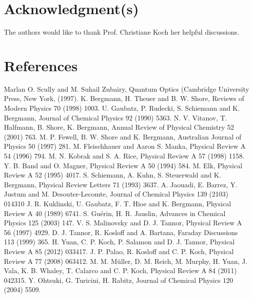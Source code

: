 \documentclass[]{interact}
\theoremstyle{plain}%
\theoremstyle{definition}
\theoremstyle{remark}
\begin{document}
\section*{Acknowledgment(s)}
The authors would like to thank Prof. Christiane Koch her helpful 
discussions.
\section*{References}
\begin{thebibliography}{99}
Marlan O. Scully and M. Suhail Zubairy, Quantum Optics (Cambridge University 
Press, New York, (1997).
K. Bergmann, H. Theuer and B. W. Shore, Reviews of Modern
Physics 70 (1998) 1003.
U. Gaubatz, P. Rudecki, S. Schiemann and K. Bergmann, Journal of Chemical 
Physics 92 (1990) 5363. 
N. V. Vitanov, T. Halfmann, B. Shore, K. Bergmann, Annual Review of Physical 
Chemistry 52 (2001) 763.
M. P. Fewell, B. W. Shore and K. Bergmann, Australian Journal of Physics 50 
(1997) 281.
M. Fleischhauer and Aaron S. Manka, Physical Review A 54 (1996) 794.
M. N. Kobrak and S. A. Rice, Physical Review A 57 (1998) 1158.
Y. B. Band and O. Magner, Physical Review A 50 (1994) 584.
M. Elk, Physical Review A 52 (1995) 4017.
S. Schiemann, A. Kuhn, S. Steuerwald and K. Bergmann, Physical Review Letters 
71 (1993) 3637.
A. Jaouadi, E. Barrez, Y. Justum  and M. Desouter-Lecomte, Journal of Chemical 
Physics 139 (2103) 014310
J. R. Kuklinski, U. Gaubatz, F. T. Hioe and K. Bergmann, Physical Review A 40 
(1989) 6741.
S. Gu\'erin, H. R. Jauslin, Advances in Chemical Physics 125 (2003) 147.
V. S. Malinovsky and D. J. Tannor,  Physical Review A 56 (1997) 4929.
D. J. Tannor, R. Kosloff and A. Bartana, Faraday Discussions 113 (1999) 
365.
H. Yuan, C. P. Koch, P. Salamon and D. J. Tannor, Physical Review A 85 (2012) 
033417.
J. P. Palao, R. Kosloff and C. P. Koch,  Physical Review A 77 (2008) 
063412.
M. M. M\"uller, D. M. Reich, M. Murphy, H. Yuan, J. Vala, K. B. Whaley, T. 
Calarco and C. P. Koch, Physical Review A 84 (2011) 042315.
Y. Ohtsuki, G. Turicini, H. Rabitz, Journal of Chemical Physics 120 (2004) 5509.

\end{thebibliography}
\end{document}
